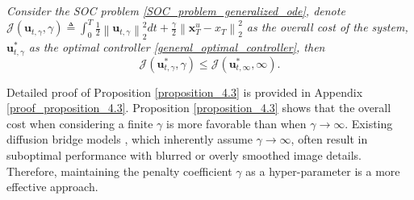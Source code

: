 \begin{proposition}\label{proposition_4.3} 
\textit{Consider the SOC problem \eqref{SOC_problem_generalized_ode}, denote $\mathcal{J}(\mathbf{u}_{t, \gamma}, \gamma) \triangleq \int_0^T \frac{1}{2} \left\|\mathbf{u}_{t, \gamma}\right\|_2^2 d t+\frac{\gamma}{2}\left\|\mathbf{x}_T^{u}-x_T\right\|_2^2$ as the overall cost of the system, $\mathbf{u}_{t, \gamma}^{*}$ as the optimal controller \eqref{general_optimal_controller}, then}
\begin{equation}
\mathcal{J}(\mathbf{u}_{t, \gamma}^{*}, \gamma) \le \mathcal{J}(\mathbf{u}_{t, \infty}^{*}, \infty).
\end{equation}
\end{proposition}
Detailed proof of Proposition \ref{proposition_4.3} is provided in Appendix \ref{proof_proposition_4.3}. Proposition \ref{proposition_4.3} shows that the overall cost when considering a finite $\gamma$ is more favorable than when $\gamma \rightarrow \infty$. Existing diffusion bridge models \cite{zhou2023denoisingdiffusionbridgemodels, yue2024imagerestorationgeneralizedornsteinuhlenbeck}, which inherently assume $\gamma \rightarrow \infty$, often result in suboptimal performance with blurred or overly smoothed image details. Therefore, maintaining the penalty coefficient $\gamma$ as a hyper-parameter is a more effective approach.  


